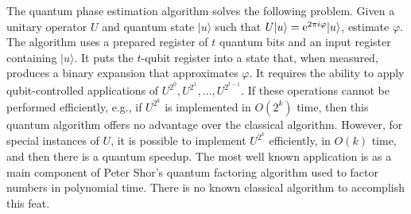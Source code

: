 \documentclass{article}[12pt]
\begin{document}
The quantum phase estimation algorithm solves the following problem.  Given a unitary operator $U$ and quantum state $\lvert u \rangle$ such that $U \lvert u \rangle = {\rm e}^{2 \pi i \varphi} \lvert u \rangle$, estimate $\varphi$. The algorithm uses a prepared register of $t$ quantum bits and an input register containing $\lvert u \rangle$.  It puts the $t$-qubit register into a state that, when measured, produces a binary expansion that approximates $\varphi$.  It requires the ability to apply qubit-controlled applications of $U^{2^0},U^{2^1},...,U^{2^{t-1}}$.  If these operations cannot be performed efficiently, e.g., if $U^{2^k}$ is implemented in $O(2^k)$ time, then this quantum algorithm offers no advantage over the classical algorithm.  However, for special instances of $U$, it is possible to implement $U^{2^k}$ efficiently, in $O(k)$ time, and then there is a quantum speedup.  The most well known application is as a main component of Peter Shor’s quantum factoring algorithm used to factor numbers in polynomial time.  There is no known classical algorithm to accomplish this feat.
\end{document}
